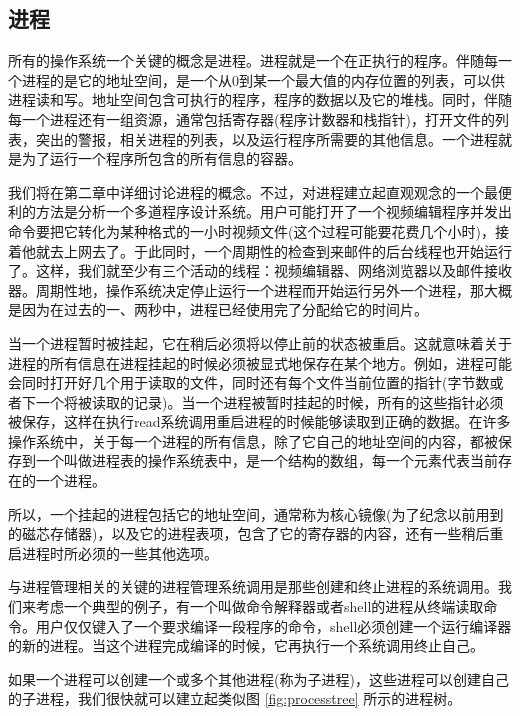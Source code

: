 	\subsection{进程}
	
	所有的操作系统一个关键的概念是进程。进程就是一个在正执行的程序。伴随每一个进程的是它的地址空间，是一个从0到某一个最大值的内存位置的列表，可以供进程读和写。地址空间包含可执行的程序，程序的数据以及它的堆栈。同时，伴随每一个进程还有一组资源，通常包括寄存器(程序计数器和栈指针)，打开文件的列表，突出的警报，相关进程的列表，以及运行程序所需要的其他信息。一个进程就是为了运行一个程序所包含的所有信息的容器。
	
	我们将在第二章中详细讨论进程的概念。不过，对进程建立起直观观念的一个最便利的方法是分析一个多道程序设计系统。用户可能打开了一个视频编辑程序并发出命令要把它转化为某种格式的一小时视频文件(这个过程可能要花费几个小时)，接着他就去上网去了。于此同时，一个周期性的检查到来邮件的后台线程也开始运行了。这样，我们就至少有三个活动的线程：视频编辑器、网络浏览器以及邮件接收器。周期性地，操作系统决定停止运行一个进程而开始运行另外一个进程，那大概是因为在过去的一、两秒中，进程已经使用完了分配给它的时间片。
	
	当一个进程暂时被挂起，它在稍后必须将以停止前的状态被重启。这就意味着关于进程的所有信息在进程挂起的时候必须被显式地保存在某个地方。例如，进程可能会同时打开好几个用于读取的文件，同时还有每个文件当前位置的指针(字节数或者下一个将被读取的记录)。当一个进程被暂时挂起的时候，所有的这些指针必须被保存，这样在执行read系统调用重启进程的时候能够读取到正确的数据。在许多操作系统中，关于每一个进程的所有信息，除了它自己的地址空间的内容，都被保存到一个叫做进程表的操作系统表中，是一个结构的数组，每一个元素代表当前存在的一个进程。
	
	所以，一个挂起的进程包括它的地址空间，通常称为核心镜像(为了纪念以前用到的磁芯存储器)，以及它的进程表项，包含了它的寄存器的内容，还有一些稍后重启进程时所必须的一些其他选项。
	
	与进程管理相关的关键的进程管理系统调用是那些创建和终止进程的系统调用。我们来考虑一个典型的例子，有一个叫做命令解释器或者shell的进程从终端读取命令。用户仅仅键入了一个要求编译一段程序的命令，shell必须创建一个运行编译器的新的进程。当这个进程完成编译的时候，它再执行一个系统调用终止自己。
	
	如果一个进程可以创建一个或多个其他进程(称为子进程)，这些进程可以创建自己的子进程，我们很快就可以建立起类似图 \ref{fig:processtree} 所示的进程树。
	
